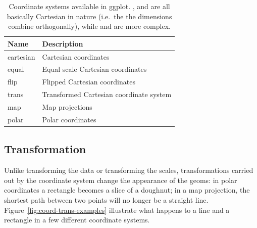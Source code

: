 \begin{table}
  \begin{center}
  \begin{tabular}{ll}
    \toprule
    Name      & Description  \\
    \midrule
    cartesian & Cartesian coordinates                  \\
    equal     & Equal scale Cartesian coordinates      \\
    flip      & Flipped Cartesian coordinates          \\
    trans     & Transformed Cartesian coordinate system\\[1em]
    map       & Map projections                        \\
    polar     & Polar coordinates                      \\
    \bottomrule
    
  \end{tabular}
  \end{center}
  \caption{Coordinate systems available in ggplot.  ,  and  are all basically Cartesian in nature (i.e.\ the the dimensions combine orthogonally), while  and  are more complex.}
  \label{tbl:coord}
\end{table}

\subsection{Transformation}
\label{sub:coord-transformation}

Unlike transforming the data or transforming the scales, transformations carried out by the coordinate system change the appearance of the geoms: in polar coordinates a rectangle becomes a slice of a doughnut; in a map projection, the shortest path between two points will no longer be a straight line.  Figure~\ref{fig:coord-trans-examples} illustrate what happens to a line and a rectangle in a few different coordinate systems.

% 



